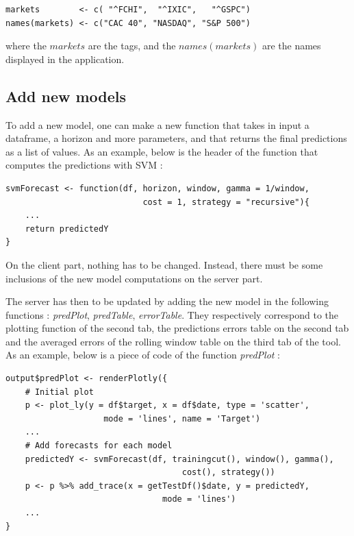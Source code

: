 \documentclass[11pt,a4paper,oneside]{book}
\begin{document}
\begin{lstlisting}
markets        <- c( "^FCHI",  "^IXIC",   "^GSPC")
names(markets) <- c("CAC 40", "NASDAQ", "S&P 500")
\end{lstlisting}

where the $markets$ are the tags, and the $names(markets)$ are the names displayed in the application.


\subsection{Add new models}

To add a new model, one can make a new function that takes in input a dataframe, a horizon and more parameters, and that returns the final predictions as a list of values. As an example, below is the header of the function that computes the predictions with SVM : \\


\begin{lstlisting}
svmForecast <- function(df, horizon, window, gamma = 1/window, 
                            cost = 1, strategy = "recursive"){
    ...
    return predictedY
}
\end{lstlisting}


On the client part, nothing has to be changed. Instead, there must be some inclusions of the new model computations on the server part.

The server has then to be updated by adding the new model in the following functions : \textit{predPlot}, \textit{predTable}, \textit{errorTable}. They respectively correspond to the plotting function of the second tab, the predictions errors table on the second tab and the averaged errors of the rolling window table on the third tab of the tool. As an example, below is a piece of code of the function \textit{predPlot} : \\

\begin{lstlisting}
output$predPlot <- renderPlotly({
    # Initial plot
    p <- plot_ly(y = df$target, x = df$date, type = 'scatter',
                    mode = 'lines', name = 'Target')
    ...
    # Add forecasts for each model
    predictedY <- svmForecast(df, trainingcut(), window(), gamma(), 
                                    cost(), strategy())
    p <- p %>% add_trace(x = getTestDf()$date, y = predictedY, 
                                mode = 'lines')
    ...
}
\end{lstlisting}
\end{document}
